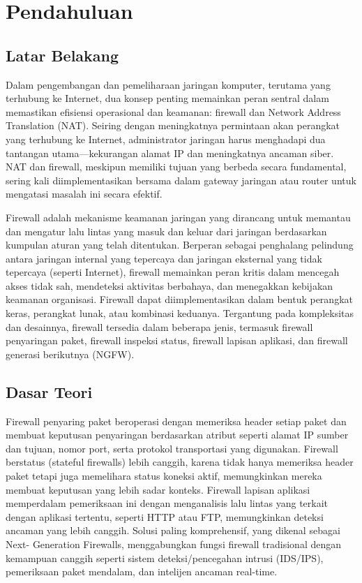 \section{Pendahuluan}
\subsection{Latar Belakang}
Dalam pengembangan dan pemeliharaan jaringan komputer, terutama 
yang terhubung ke Internet, dua konsep penting memainkan peran 
sentral dalam memastikan efisiensi operasional dan keamanan: 
firewall dan Network Address Translation (NAT). Seiring dengan 
meningkatnya permintaan akan perangkat yang terhubung ke 
Internet, administrator jaringan harus menghadapi dua tantangan 
utama—kekurangan alamat IP dan meningkatnya ancaman siber. NAT 
dan firewall, meskipun memiliki tujuan yang berbeda secara 
fundamental, sering kali diimplementasikan bersama dalam gateway 
jaringan atau router untuk mengatasi masalah ini secara efektif.

Firewall adalah mekanisme keamanan jaringan yang dirancang untuk 
memantau dan mengatur lalu lintas yang masuk dan keluar dari 
jaringan berdasarkan kumpulan aturan yang telah ditentukan. 
Berperan sebagai penghalang pelindung antara jaringan internal 
yang tepercaya dan jaringan eksternal yang tidak tepercaya 
(seperti Internet), firewall memainkan peran kritis dalam 
mencegah akses tidak sah, mendeteksi aktivitas berbahaya, dan 
menegakkan kebijakan keamanan organisasi. Firewall dapat 
diimplementasikan dalam bentuk perangkat keras, perangkat lunak, 
atau kombinasi keduanya. Tergantung pada kompleksitas dan 
desainnya, firewall tersedia dalam beberapa jenis, termasuk 
firewall penyaringan paket, firewall inspeksi status, firewall 
lapisan aplikasi, dan firewall generasi berikutnya (NGFW).

\subsection{Dasar Teori}
Firewall penyaring paket beroperasi dengan memeriksa header 
setiap paket dan membuat keputusan penyaringan berdasarkan 
atribut seperti alamat IP sumber dan tujuan, nomor port, serta 
protokol transportasi yang digunakan. Firewall berstatus 
(stateful firewalls) lebih canggih, karena tidak hanya memeriksa 
header paket tetapi juga memelihara status koneksi aktif, 
memungkinkan mereka membuat keputusan yang lebih sadar konteks. 
Firewall lapisan aplikasi memperdalam pemeriksaan ini dengan 
menganalisis lalu lintas yang terkait dengan aplikasi tertentu, 
seperti HTTP atau FTP, memungkinkan deteksi ancaman yang lebih 
canggih. Solusi paling komprehensif, yang dikenal sebagai Next-
Generation Firewalls, menggabungkan fungsi firewall tradisional 
dengan kemampuan canggih seperti sistem deteksi/pencegahan 
intrusi (IDS/IPS), pemeriksaan paket mendalam, dan intelijen 
ancaman real-time.

